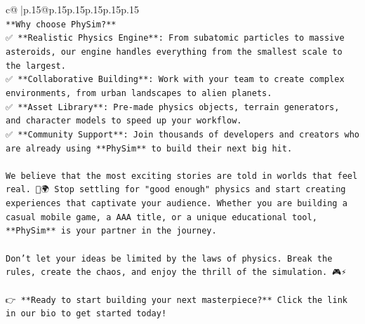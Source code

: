 \documentclass{article}
\begin{document}
{\begin{supertabular}{c@{$\;$}|p{.15\linewidth}@{}p{.15\linewidth}p{.15\linewidth}p{.15\linewidth}p{.15\linewidth}p{.15\linewidth}}
{{{\\ 
\texttt{**Why choose PhySim?**} \\
\texttt{✅ **Realistic Physics Engine**: From subatomic particles to massive asteroids, our engine handles everything from the smallest scale to the largest.} \\
\texttt{✅ **Collaborative Building**: Work with your team to create complex environments, from urban landscapes to alien planets.} \\
\texttt{✅ **Asset Library**: Pre{-}made physics objects, terrain generators, and character models to speed up your workflow.} \\
\texttt{✅ **Community Support**: Join thousands of developers and creators who are already using **PhySim** to build their next big hit.} \\
\\ 
\texttt{We believe that the most exciting stories are told in worlds that feel real. 📖🌍 Stop settling for "good enough" physics and start creating experiences that captivate your audience. Whether you are building a casual mobile game, a AAA title, or a unique educational tool, **PhySim** is your partner in the journey.} \\
\\ 
\texttt{Don't let your ideas be limited by the laws of physics. Break the rules, create the chaos, and enjoy the thrill of the simulation. 🎮⚡} \\
\\ 
\texttt{👉 **Ready to start building your next masterpiece?** Click the link in our bio to get started today!} \\
\\ 
}}}
\end{supertabular}}
\end{document}
